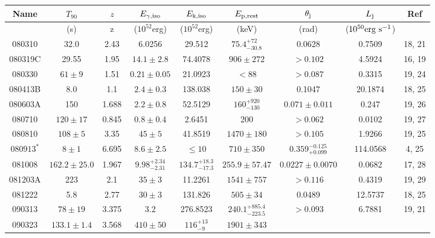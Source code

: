\documentclass[a4paper,fleqn,usenatbib]{mnras}
\begin{document}
 \begin{table*}
 \contcaption{}
 \label{tab:continued2}
\begin{tabular}[width=1.0 \linewidth]{ccccccccc}
\hline
\hline
Name & $T_{90}$ & $z$ & $E_{\rm \gamma,\rm iso}$ & $E_{\rm k,\rm iso}$ & $E_{\rm p,\rm rest}$ & $\theta_{\rm j}$ & $L_{\rm j}$ &  Ref  \\
\hline
 & (s) & z & ($10^{52}$\rm erg) & ($10^{52}$\rm erg) &(\rm keV) & (rad) & ($10^{50} \rm erg\rm~s^{-1}$) &  \\
\hline																																																																																																																																							080310 &	32.0 &	2.43 &	   6.0256 &	29.512 &	$75.4_{-30.8}^{+72}$ &	0.0628 &	0.7509 &	18, 21\\																																																																					080319C &	29.55 &	1.95 &	$14.1 \pm 2.8$ &	74.4078 &	$906 \pm 272$ &	$>0.102$ &	4.5924 &	16, 19 \\																																																																					080330 &	$61 \pm 9$ &	1.51 &	$0.21\pm0.05$ &	21.0923 &	$<88$ &	$>0.087$ &	0.3315 &	19, 24 \\																																																																					080413B &	8.0 &	1.1 &	$2.4 \pm 0.3$ &	138.038 &	$150 \pm 30$ &	0.1047 &	20.1874 &	18, 25 \\																																																																					080603A &	150 &	1.688 &	$2.2\pm0.8$ &	52.5129 &	$160_{-130}^{+920}$ &	$0.071 \pm 0.011$ &	0.247 &	19, 26\\																																																																					080710 &	$120\pm17$ &	0.845 &	$0.8\pm0.4$ &	2.6451 &	200 &	$>0.062$ &	0.0102 &	19, 27 \\																																																																					080810 &	$108 \pm5$ &	3.35 &	$45 \pm 5$ &	41.8519 &	$1470 \pm 180$ &	$>0.105$ &	1.9266 &	19, 25 \\																																																																					$080913^{*}$ &	$8\pm1$ &	6.695 &	$8.6\pm2.5$ &	$\leqslant 10$ &	$710\pm350$ &	$0.359_{+0.099}^{-0.125}$ &	114.0568 &	4, 25 \\																																																																					081008 &	$162.2\pm25.0$ &	1.967 &	$9.98_{-2.31}^{+2.34}$ &	$134.7_{-17.3}^{+18.3}$ &	$255.9\pm57.47$ &	$0.0227\pm0.0070$ &	0.0682 &	17, 28 \\																																																																					081203A &	223 &	2.1 &	$35 \pm 3$ &	11.2261 &	$1541 \pm 757$ &	$>0.116$ &	0.4319 &	19, 29 \\																																																																					081222 &	5.8 &	2.77 &	$30 \pm 3$ &	131.826 &	$505 \pm 34$ &	0.0489 &	12.5737 &	18, 25 \\																																																																					090313 &	$78 \pm 19$ &	3.375 &	3.2 &	276.8523 &	$240.1_{-223.5}^{+885.4}$ &	$>0.093$ &	6.7881 &	19, 21 \\																																																																					090323 &	$133.1\pm1.4$ &	3.568  &	$410\pm50$ &	$116_{-9}^{+13}$ & $1901 \pm 343$ 
\end{tabular}
\end{table*}
\end{document}
